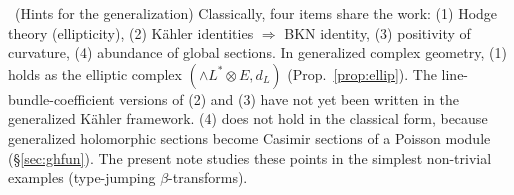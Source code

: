\begin{rem}\tK\ (Hints for the generalization)
Classically, four items share the work: (1) Hodge theory (ellipticity), (2) K\"ahler identities $\Rightarrow$ BKN identity, (3) positivity of curvature, (4) abundance of global sections. In generalized complex geometry, (1) holds as the elliptic complex $(\wedge L^*\otimes E,d_L)$ (Prop.~\ref{prop:ellip}). The line-bundle-coefficient versions of (2) and (3) have not yet been written in the generalized K\"ahler framework. (4) does not hold in the classical form, because generalized holomorphic sections become Casimir sections of a Poisson module (\S\ref{sec:ghfun}). The present note studies these points in the simplest non-trivial examples (type-jumping $\beta$-transforms).
\end{rem}

